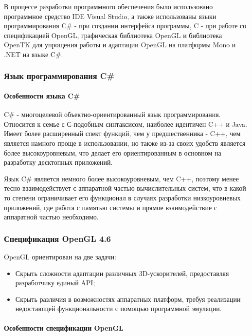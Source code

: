 В процессе разработки программного обеспечения было использовано программное средство IDE Visual Studio, а также использованы языки программирования C\# - при создании интерфейса программы, C - при работе со спецификацией OpenGL, графическая библиотека OpenGL и библиотека OpenTK для упрощения работы и адаптации OpenGL на платформы Mono и .NET на языке C\#.

\subsubsection{Язык программирования C\#}

\paragraph{Особенности языка C\#}

C\# - многоцелевой объектно-ориентированный язык программирования. Относится к семье с С-подобным синтаксисом, наиболее идентичен C++ и Java. Имеет более расширенный спект функций, чем у предшественника - C++, чем является намного проще в использовании, но также из-за своих удобств является более высокоуровневым, что делает его ориентированным в основном на разработку десктопных приложений.

Язык C\# является немного более высокоуровневым, чем C++, поэтому менее тесно взаимодействует с аппаратной частью вычислительных систем, что в какой-то степени ограничивает его функционал в случаях разработки низкоуровневых приложений, где работа с памятью системы и прямое взаимодействие с аппаратной частью необходимо.

\subsubsection{Спецификация OpenGL 4.6}

OpenGL ориентирован на две задачи:
\begin{itemize}
	\item Скрыть сложности адаптации различных 3D-ускорителей, предоставляя разработчику единый API;
	\item Скрыть различия в возможностях аппаратных платформ, требуя реализации недостающей функциональности с помощью программной эмуляции.
\end{itemize}

\paragraph{Особенности спецификации OpenGL}

